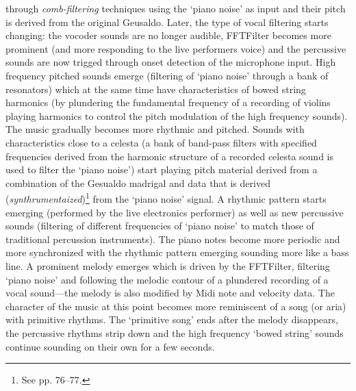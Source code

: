 through \emph{comb-filtering} techniques using the `piano noise' as input and their pitch is derived from the original Geusaldo. Later, the type of vocal filtering starts changing: the vocoder sounds are no longer audible, FFTFilter becomes more prominent (and more responding to the live performers voice) and the percussive sounds are now trigged through onset detection of the microphone input. High frequency pitched sounds emerge (filtering of `piano noise' through a bank of resonators) which at the same time have characteristics of bowed string harmonics (by plundering the fundamental frequency of a recording of violins playing harmonics to control the pitch modulation of the high frequency sounds). The music gradually becomes more rhythmic and pitched. Sounds with characteristics close to a celesta (a bank of band-pass filters with specified frequencies derived from the harmonic structure of a recorded celesta sound is used to filter the `piano noise') start playing pitch material derived from a combination of the Gesualdo madrigal and data that is derived (\emph{synthrumentaized})\footnote{See \hypertarget{spectactics}{pp. 76--77}.} from the `piano noise' signal. A rhythmic pattern starts emerging (performed by the live electronics performer) as well as new percussive sounds (filtering of different frequencies of `piano noise' to match those of traditional percussion instruments). The piano notes become more periodic and more synchronized with the rhythmic pattern emerging sounding more like a bass line. A prominent melody emerges which is driven by the FFTFilter, filtering `piano noise' and following the melodic contour of a plundered recording of a vocal sound---the melody is also modified by Midi note and velocity data. The character of the music at this point becomes more reminiscent of a song (or aria) with primitive rhythms. The `primitive song' ends after the melody disappears, the percussive rhythms strip down and the high frequency `bowed string' sounds continue sounding on their own for a few seconds.

